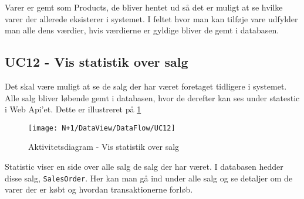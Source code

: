 Varer er gemt som Products, de bliver hentet ud så det er muligt at se hvilke varer der allerede eksisterer i systemet. I feltet hvor man kan tilføje vare udfylder man alle dens værdier, hvis værdierne er gyldige bliver de gemt i databasen. 

\subsection{UC12 - Vis statistik over salg}
Det skal være muligt at se de salg der har været foretaget tidligere i systemet. Alle salg bliver løbende gemt i databasen, hvor de derefter kan ses under statestic i Web Api'et. Dette er illustreret på \ref{fig:AD_UC12}

\begin{figure}[H]
    \centering
    \texttt{[image: N+1/DataView/DataFlow/UC12]}
    \caption{Aktivitetsdiagram - Vis statistik over salg}
    \label{fig:AD_UC12}
\end{figure} 

Statistic viser en side over alle salg de salg der har været. I databasen hedder disse salg, \texttt{SalesOrder}. Her kan man gå ind under alle salg og se detaljer om de varer der er købt og hvordan transaktionerne forløb. 